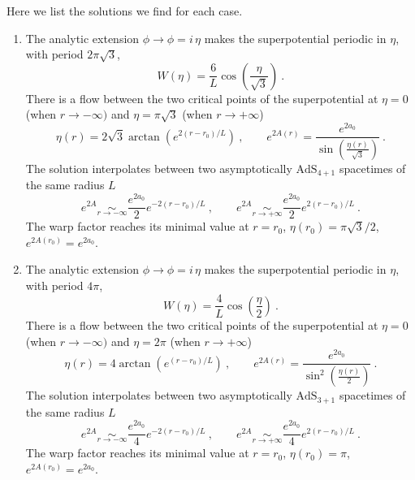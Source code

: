 Here we list the solutions we find for each case. 
\begin{enumerate}
	\item The analytic extension $\phi\to \phi=i\, \eta$ makes the superpotential periodic in $\eta$, with period $2\pi\sqrt{3}$,
\begin{equation}
	\label{eq:Wex1}
	W(\eta) = \frac{6}{L} \cos\left(\frac{\eta}{\sqrt{3}}\right)\ .
\end{equation}
There is a flow between the two critical points of the superpotential at $\eta=0$ (when $r\to-\infty)$ and $\eta=\pi\sqrt{3}$ (when $r\to +\infty$)
\begin{equation}\label{eq:sol1}
	\eta(r)=2\sqrt{3} \arctan\left(e^{2(r-r_0)/L} \right)
	\ ,\qquad 
	e^{2A(r)}=\frac{e^{2a_0}}{\sin\left(\frac{\eta(r)}{\sqrt{3}}\right)}\ .
\end{equation}
The solution interpolates between two asymptotically $\text{AdS}_{4+1}$ spacetimes of the same radius $L$
\begin{equation}
	e^{2A} \underset{r\to-\infty}{\sim} \frac{e^{2a_0}}{2}e^{-2(r-r_0)/L}
	\ ,\qquad 
	e^{2A} \underset{r\to +\infty}{\sim} \frac{e^{2a_0}}{2}e^{2(r-r_0)/L}\ .
\end{equation}
The warp factor reaches its minimal value at $r=r_0$, $\eta(r_0)=\pi\sqrt{3}/2$, $e^{2A(r_0)}=e^{2a_0}$.

	\item The analytic extension $\phi\to \phi=i\, \eta$ makes the superpotential periodic in $\eta$, with period $4\pi$,
\begin{equation}
	\label{eq:Wex2}
	W(\eta)=\frac{4}{L}\cos\left(\frac{\eta}{2}\right)\ .
\end{equation}
There is a flow between the two critical points of the superpotential at $\eta=0$ (when $r\to-\infty)$ and $\eta=2\pi$ (when $r\to +\infty$)
\begin{equation}\label{eq:sol2}
	\eta(r)=4 \arctan\left(e^{(r-r_0)/L} \right)
	\ ,\qquad e^{2A(r)}=\frac{e^{2a_0}}{\sin^2\left(\frac{\eta(r)}{2}\right)}\ .
\end{equation}
The solution interpolates between two asymptotically $\text{AdS}_{3+1}$ spacetimes of the same radius $L$
\begin{equation}
	e^{2A} \underset{r\to-\infty}{\sim} \frac{e^{2a_0}}{4}e^{-2(r-r_0)/L}
	\ ,\qquad 
	e^{2A} \underset{r\to +\infty}{\sim} \frac{e^{2a_0}}{4}e^{2(r-r_0)/L}\ .
\end{equation}
The warp factor reaches its minimal value at $r=r_0$, $\eta(r_0)=\pi$, $e^{2A(r_0)}=e^{2a_0}$.


\end{enumerate}
